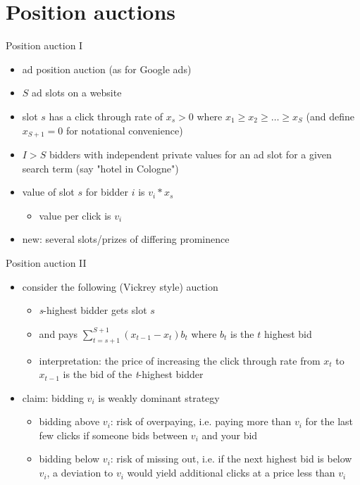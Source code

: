 \documentclass[bigger]{beamer}
\begin{document}
\section{Position auctions}
\label{sec:org4af1ff4}
\begin{frame}[label={sec:orgea816ef}]{Position auction I}
\begin{itemize}
\item ad position auction (as for Google ads)
\item \(S\) ad slots on a website
\item slot \(s\) has a click through rate of \(x_s>0\) where \(x_1\geq x_2\geq\dots\geq x_S\) (and define \(x_{S+1}=0\) for notational convenience)
\item \(I>S\) bidders with independent private values for an ad slot for a given search term (say "hotel in Cologne")
\item value of slot \(s\) for bidder \(i\) is \(v_i*x_s\)
\begin{itemize}
\item value per click is \(v_i\)
\end{itemize}
\vspace*{0.5cm}
\item new: several slots/prizes of differing prominence
\end{itemize}
\end{frame}
\begin{frame}[label={sec:orgc5a8295}]{Position auction II}
\begin{itemize}
\item consider the following (Vickrey style) auction
\begin{itemize}
\item \emph{s}-highest bidder gets slot \(s\)
\item and pays \(\sum_{t=s+1}^{S+1} (x_{t-1}-x_{t})b_t\) where \(b_t\) is the \(t\) highest bid
\item interpretation: the price of increasing the click through rate from \(x_t\) to \(x_{t-1}\) is the bid of the \emph{t}-highest bidder
\end{itemize}
\item claim: bidding \(v_i\) is weakly dominant strategy
\begin{itemize}
\item bidding above \(v_i\): risk of overpaying, i.e. paying more than \(v_i\) for the last few clicks if someone bids between \(v_i\) and your bid
\item bidding below \(v_i\): risk of missing out, i.e. if the next highest bid is below \(v_i\), a deviation to \(v_i\) would yield additional clicks at a price less than \(v_i\)
\end{itemize}
\end{itemize}
\end{frame}
\end{document}

